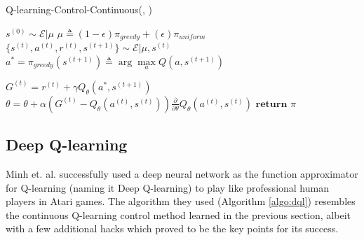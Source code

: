 \documentclass[11pt]{article}
\begin{document}
\begin{algorithm}[H]
\caption{Q-learning-Control-Continuous(\mu, \epsilon)}
\label{algo:ql-continuous}
\begin{algorithmic}[1]

\STATE $s^{(0)} \sim \mathcal{E}|\mu$
\vspace{0.15cm}
\vspace{0.15cm}
\STATE $\mu \triangleq (1-\epsilon) \pi_{greedy} + (\epsilon)  \pi_{uniform}$
\vspace{0.15cm}
\STATE $\{s^{(t)}, a^{(t)}, r^{(t)}, s^{(t+1)}\} \sim \mathcal{E}|\mu, s^{(t)}$
\vspace{0.15cm}
\STATE $a^* = \pi_{greedy}(s^{(t+1)}) \triangleq \arg \max\limits_a Q(a, s^{(t+1)})$
\vspace{0.15cm}

\STATE $G^{(t)} = r^{(t)} + \gamma Q_{\theta}(a^{*}, s^{(t+1)})$\\
\vspace{0.15cm}
\STATE $\theta = \theta + \alpha \left( G^{(t)} - Q_{\theta}(a^{(t)}, s^{(t)})\right)\frac{\partial}{\partial \theta}Q_{\theta}(a^{(t)}, s^{(t)})$
\vspace{0.15cm}
\vspace{0.15cm}
\ENDFOR
\ENDFOR
\STATE $\textbf{return } \pi$
\end{algorithmic}
\end{algorithm}

\subsection{Deep Q-learning}
\label{sec:dql}

Minh et. al. \cite{mnih2015human} successfully used a deep neural network as the function approximator for Q-learning (naming it Deep Q-learning) to play like professional human players in Atari games. The algorithm they used (Algorithm \ref{algo:dql}) resembles the continuous Q-learning control method learned in the previous section, albeit with a few additional hacks which proved to be the key points for its success. 
\end{document}
